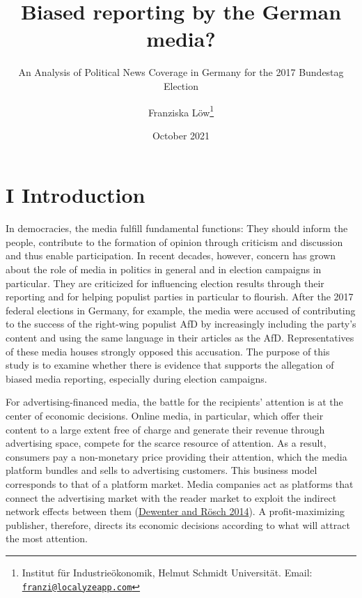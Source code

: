\documentclass[
]{article}
\title{Biased reporting by the German media?}
\subtitle{An Analysis of Political News Coverage in Germany for the 2017
Bundestag Election}
\author{Franziska Löw\footnote{Institut für Industrieökonomik, Helmut
  Schmidt Universität. Email:
  \href{mailto:franzi@localyzeapp.com}{\nolinkurl{franzi@localyzeapp.com}}}}
\date{October 2021}
\begin{document}
\maketitle

\hypertarget{i-introduction}{%
\section{I Introduction}\label{i-introduction}}

In democracies, the media fulfill fundamental functions: They should
inform the people, contribute to the formation of opinion through
criticism and discussion and thus enable participation. In recent
decades, however, concern has grown about the role of media in politics
in general and in election campaigns in particular. They are criticized
for influencing election results through their reporting and for helping
populist parties in particular to flourish. After the 2017 federal
elections in Germany, for example, the media were accused of
contributing to the success of the right-wing populist AfD by
increasingly including the party's content and using the same language
in their articles as the AfD. Representatives of these media houses
strongly opposed this accusation. The purpose of this study is to
examine whether there is evidence that supports the allegation of biased
media reporting, especially during election campaigns.

For advertising-financed media, the battle for the recipients' attention
is at the center of economic decisions. Online media, in particular,
which offer their content to a large extent free of charge and generate
their revenue through advertising space, compete for the scarce resource
of attention. As a result, consumers pay a non-monetary price providing
their attention, which the media platform bundles and sells to
advertising customers. This business model corresponds to that of a
platform market. Media companies act as platforms that connect the
advertising market with the reader market to exploit the indirect
network effects between them
(\protect\hyperlink{ref-dewenter_einfuhrung_2014}{Dewenter and Rösch
2014}). A profit-maximizing publisher, therefore, directs its economic
decisions according to what will attract the most attention.
\end{document}

